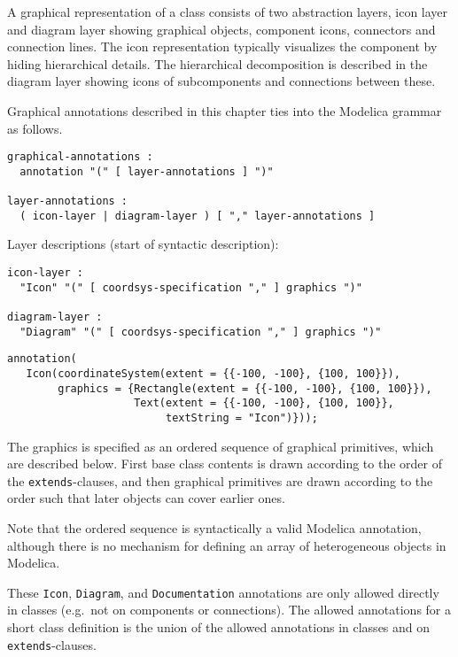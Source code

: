A graphical representation of a class consists of two abstraction
layers, icon layer and diagram layer showing graphical objects,
component icons, connectors and connection lines. The icon
representation typically visualizes the component by hiding hierarchical
details. The hierarchical decomposition is described in the diagram
layer showing icons of subcomponents and connections between these.

Graphical annotations described in this chapter ties into the Modelica
grammar as follows.
\begin{lstlisting}[language=grammar]
graphical-annotations :
  annotation "(" [ layer-annotations ] ")"

layer-annotations :
  ( icon-layer | diagram-layer ) [ "," layer-annotations ]
\end{lstlisting}
Layer descriptions (start of syntactic description):
\begin{lstlisting}[language=grammar]
icon-layer :
  "Icon" "(" [ coordsys-specification "," ] graphics ")"

diagram-layer :
  "Diagram" "(" [ coordsys-specification "," ] graphics ")"
\end{lstlisting}%

\begin{example}
\begin{lstlisting}[language=modelica]
annotation(
   Icon(coordinateSystem(extent = {{-100, -100}, {100, 100}}),
        graphics = {Rectangle(extent = {{-100, -100}, {100, 100}}),
                    Text(extent = {{-100, -100}, {100, 100}},
                         textString = "Icon")}));
\end{lstlisting}
\end{example}

The graphics is specified as an ordered sequence of graphical primitives, which are described below.
First base class contents is drawn according to the order of the \lstinline!extends!-clauses, and then graphical primitives are drawn according to the order such that later objects can cover earlier ones.

\begin{nonnormative}
Note that the ordered sequence is syntactically a valid Modelica annotation, although there
is no mechanism for defining an array of heterogeneous objects in Modelica.
\end{nonnormative}

These \lstinline!Icon!, \lstinline!Diagram!, and \lstinline!Documentation! annotations are only allowed directly in classes (e.g.\ not on components or connections).
The allowed annotations for a short class definition is the union of the allowed annotations in classes and on \lstinline!extends!-clauses.

